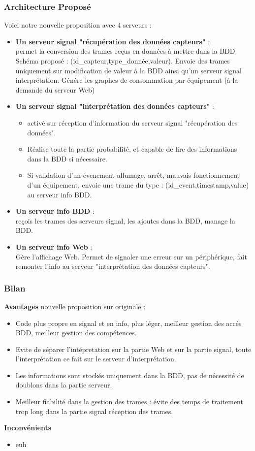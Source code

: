 \documentclass[10pt,a4paper]{article}
\begin{document}
\subsubsection{Architecture Proposé}
Voici notre nouvelle proposition avec 4 serveurs :
\begin{itemize}
  \item \textbf{Un serveur signal "récupération des données capteurs"} :\\
  permet la conversion des trames reçus en données à mettre dans la BDD. Schéma proposé : (id\_capteur,type\_donnée,valeur). Envoie des trames uniquement sur modification de valeur à la BDD ainsi qu'un serveur signal interprétation. Génére les graphes de consommation par équipement (à la demande du serveur Web)
  \item \textbf{Un serveur signal "interprétation des données capteurs"} :\\
  \begin{itemize}
    \item  activé sur réception d'information du serveur signal "récupération des données".
    \item Réalise toute la partie probabilité, et capable de lire des informations dans la BDD si nécessaire.
    \item Si validation d'un évenement allumage, arrêt, mauvais fonctionnement d'un équipement, envoie une trame du type : (id\_event,timestamp,value) au serveur info BDD.
  \end{itemize}
  \item \textbf{Un serveur info BDD} : \\
  reçois les trames des serveurs signal, les ajoutes dans la BDD, manage la BDD.
  \item \textbf{Un serveur info Web} :\\
  Gère l'affichage Web. Permet de signaler une erreur sur un périphérique, fait remonter l'info au serveur "interprétation des données capteurs".
\end{itemize}
\subsubsection{Bilan}
\textbf{Avantages} nouvelle proposition sur originale :
\begin{itemize}
  \item Code plus propre en signal et en info, plus léger, meilleur gestion des accés BDD, meilleur gestion des compétences.
  \item Evite de séparer l'intépretation sur la partie Web et sur la partie signal, toute l'interprétation ce fait sur le serveur d'interprétation.
  \item Les informations sont stockés uniquement dans la BDD, pas de nécessité de doublons dans la partie serveur.
  \item Meilleur fiabilité dans la gestion des trames : évite des temps de traitement trop long dans la partie signal réception des trames.
\end{itemize}
\textbf{Inconvénients}
\begin{itemize}
  \item euh
\end{itemize}
\end{document}
